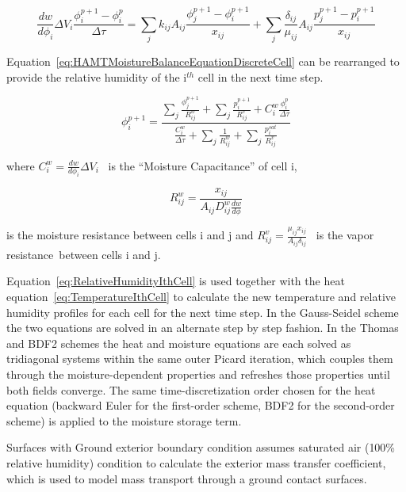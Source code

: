 \begin{equation}
\frac{{dw}}{{d{\phi_i}}}\Delta {V_i}\frac{{\phi_i^{p + 1} - \phi_i^p}}{{\Delta \tau }} = \sum\limits_j {{k_{ij}}{A_{ij}}\frac{{\phi_j^{p + 1} - \phi_i^{p + 1}}}{{{x_{ij}}}}}  + \sum\limits_j {\frac{{{\delta_{ij}}}}{{{\mu_{ij}}}}{A_{ij}}\frac{{p_j^{p + 1} - p_i^{p + 1}}}{{{x_{ij}}}}}
\label{eq:HAMTMoistureBalanceEquationDiscreteCell}
\end{equation}

Equation~\ref{eq:HAMTMoistureBalanceEquationDiscreteCell} can be rearranged to provide the relative humidity of the i\(^{th}\) cell in the next time step.

\begin{equation}
\phi_i^{p + 1} = \frac{{\sum\nolimits_j {\frac{{\phi_j^{p + 1}}}{{R_{ij}^w}}}  + \sum\nolimits_j {\frac{{p_i^{p + 1}}}{{R_{ij}^v}}}  + C_i^w\frac{{\phi_i^p}}{{\Delta \tau }}}}{{\frac{{C_i^w}}{{\Delta \tau }} + \sum\nolimits_j {\frac{1}{{R_{ij}^w}} + \sum\nolimits_j {\frac{{p_i^{sat}}}{{R_{ij}^v}}} } }}
\label{eq:RelativeHumidityIthCell}
\end{equation}

where \(C_i^w = \frac{dw}{d\phi_{i}}\Delta {V_i}\) ~is the ``Moisture Capacitance'' of cell i,

\begin{equation}
R_{ij}^w = \frac{{{x_{ij}}}}{{{A_{ij}}D_{ij}^w\frac{{dw}}{{d\phi }}}}
\end{equation}

is the moisture resistance between cells i and j and \(R_{ij}^v = \frac{\mu_{ij}x_{ij}}{A_{ij}\delta_{ij}}\) ~is the vapor resistance~between cells i and j.

Equation~\ref{eq:RelativeHumidityIthCell} is used together with the heat equation~\ref{eq:TemperatureIthCell} to calculate the new temperature and relative humidity profiles for each cell for the next time step. In the Gauss-Seidel scheme the two equations are solved in an alternate step by step fashion. In the Thomas and BDF2 schemes the heat and moisture equations are each solved as tridiagonal systems within the same outer Picard iteration, which couples them through the moisture-dependent properties and refreshes those properties until both fields converge. The same time-discretization order chosen for the heat equation (backward Euler for the first-order scheme, BDF2 for the second-order scheme) is applied to the moisture storage term.

Surfaces with Ground exterior boundary condition assumes saturated air ({100\%} relative humidity) condition to calculate the exterior mass transfer coefficient, which is used to model mass transport through a ground contact surfaces.

